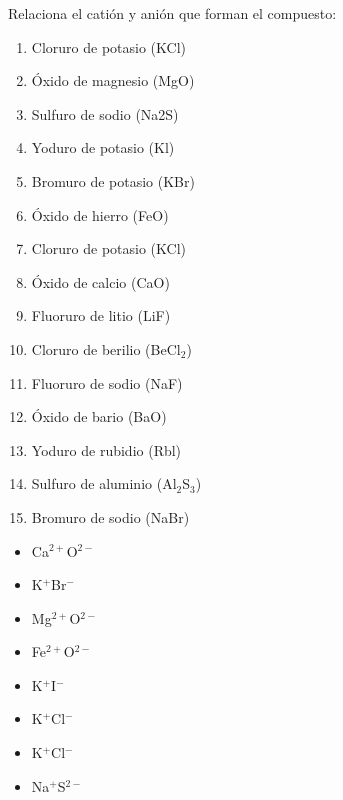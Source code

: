 \begin{boxK}
    Relaciona el catión y anión que forman el compuesto:\\

    \begin{minipage}{0.5\textwidth}
        \begin{enumerate}
            \item Cloruro de potasio (KCl)
            \item Óxido de magnesio (MgO)
            \item Sulfuro  de sodio (Na2S)
            \item Yoduro de potasio (Kl)
            \item Bromuro de potasio (KBr)
            \item Óxido de hierro (FeO)
            \item Cloruro de potasio  (KCl)
            \item Óxido de calcio (CaO)
            \item Fluoruro de litio (LiF)
            \item Cloruro de berilio (BeCl$_2$)
            \item Fluoruro de sodio (NaF)
            \item Óxido de bario (BaO)
            \item Yoduro de rubidio (Rbl)
            \item Sulfuro de aluminio (Al$_2$S$_3$)
            \item Bromuro de sodio (NaBr)
        \end{enumerate}
    \end{minipage}%
    \begin{minipage}{0.5\textwidth}
        \begin{itemize}
            \item[\rule{1cm}{0.2mm}] Ca$^{2+}$O$^{2-}$
            \item[\rule{1cm}{0.2mm}] K$^+$Br$^-$
            \item[\rule{1cm}{0.2mm}] Mg$^{2+}$O$^{2-}$
            \item[\rule{1cm}{0.2mm}] Fe$^{2+}$O$^{2-}$
            \item[\rule{1cm}{0.2mm}] K$^+$I$^-$
            \item[\rule{1cm}{0.2mm}] K$^+$Cl$^-$
            \item[\rule{1cm}{0.2mm}] K$^+$Cl$^-$
            \item[\rule{1cm}{0.2mm}] Na$^+$S$^{2-}$

\end{itemize}
\end{minipage}
\end{boxK}
